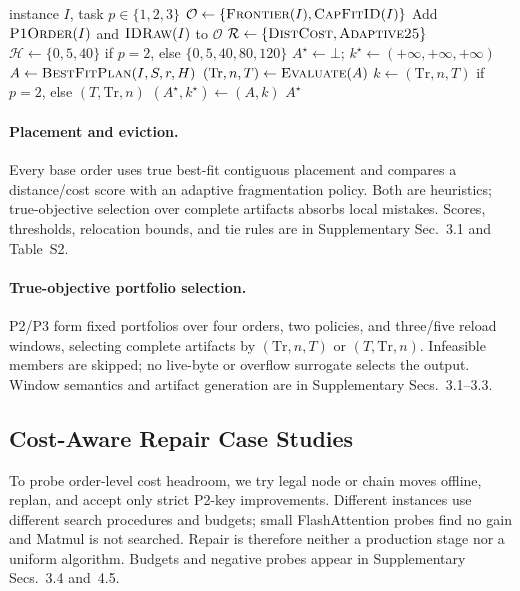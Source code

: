 \begin{algorithm}[H]
\caption{Canonical scalable solver}\label{alg:canonical}
\begin{algorithmic}[1]
\Require instance $I$, task $p\in\{1,2,3\}$
 \State \Return {} \EndIf
\State $\mathcal O\gets\{\Call{Frontier}{I},\Call{CapFitID}{I}\}$
\State Add $\Call{P1Order}{I}$ and $\Call{IDRaw}{I}$ to $\mathcal O$
\State $\mathcal R\gets\{\textsc{DistCost},\textsc{Adaptive25}\}$
\State $\mathcal H\gets\{0,5,40\}$ if $p=2$, else $\{0,5,40,80,120\}$
\State $A^\star\gets\bot$; $k^\star\gets(+\infty,+\infty,+\infty)$
  \State $A\gets\Call{BestFitPlan}{I,S,r,H}$
    \State $(\mathrm{Tr},n,T)\gets\Call{Evaluate}{A}$
    \State $k\gets(\mathrm{Tr},n,T)$ if $p=2$, else $(T,\mathrm{Tr},n)$
     \State $(A^\star,k^\star)\gets(A,k)$ \EndIf
  \EndIf
\EndFor
\State \Return $A^\star$ 
\end{algorithmic}
\end{algorithm}

\paragraph{Placement and eviction.}
Every base order uses true best-fit contiguous placement and compares a
distance/cost score with an adaptive fragmentation policy. Both are heuristics;
true-objective selection over complete artifacts absorbs local mistakes.
Scores, thresholds, relocation bounds, and tie rules are in Supplementary
Sec.~3.1 and Table~S2.

\paragraph{True-objective portfolio selection.}
P2/P3 form fixed portfolios over four orders, two policies, and three/five
reload windows, selecting complete artifacts by $(\mathrm{Tr},n,T)$ or
$(T,\mathrm{Tr},n)$. Infeasible members are skipped; no live-byte or overflow
surrogate selects the output. Window semantics and artifact generation are in
Supplementary Secs.~3.1--3.3.

\subsection{Cost-Aware Repair Case Studies}\label{sec:repair}

To probe order-level cost headroom, we try legal node or chain moves offline,
replan, and accept only strict P2-key improvements. Different
instances use different search procedures and budgets; small FlashAttention
probes find no gain and Matmul is not searched. Repair is therefore neither a
production stage nor a uniform algorithm. Budgets and negative probes appear in
Supplementary Secs.~3.4 and~4.5.

